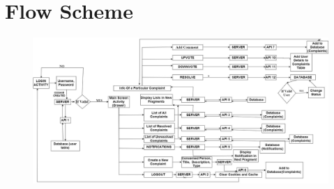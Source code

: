 \documentclass[a4paper]{article}
\begin{document}
\section{Flow Scheme}
\begin{figure}[ht]
\centering
\includegraphics[width=\textwidth]{Flow.jpg}

\end{figure}
\end{document}
